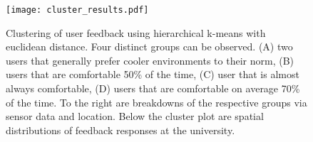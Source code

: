 
\begin{figure}
\begin{center}
\texttt{[image: cluster\_results.pdf]}
\caption{Clustering of user feedback using hierarchical k-means with euclidean distance. Four distinct groups can be observed. (A) two users that generally prefer cooler environments to their norm, (B) users that are comfortable 50\% of the time, (C) user that is almost always comfortable, (D) users that are comfortable on average 70\% of the time. To the right are breakdowns of the respective groups via sensor data and location. Below the cluster plot are spatial distributions of feedback responses at the university.}
\label{fig:clustering}
\end{center}
\end{figure}







